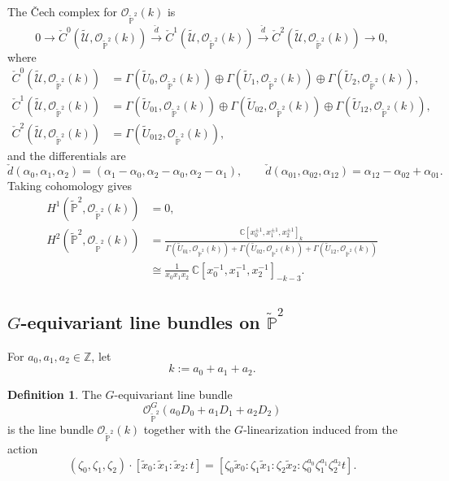 \documentclass[dvipsnames,11pt]{article}
\theoremstyle{definition}
\newtheorem{definition}[theorem]{Definition}
\newcommand{\cO}{\mathcal{O}}
\newcommand{\Z}{{\mathbb Z}}
\newcommand{\C}{{\mathbb C}}
\renewcommand{\P}{{\mathbb P}}
\begin{document}
\begin{appendices}
The \v Cech complex for \(\cO_{\widetilde{\P}^2}(k)\) is
\[
0
\to
\check C^0(\widetilde{\mathcal U},\cO_{\widetilde{\P}^2}(k))
\xrightarrow{\ \check d\ }
\check C^1(\widetilde{\mathcal U},\cO_{\widetilde{\P}^2}(k))
\xrightarrow{\ \check d\ }
\check C^2(\widetilde{\mathcal U},\cO_{\widetilde{\P}^2}(k))
\to 0,
\]
where
\begin{align*}
\check C^0(\widetilde{\mathcal U},\cO_{\widetilde{\P}^2}(k))
&=
\Gamma(\widetilde U_0,\cO_{\widetilde \P^2}(k))
\oplus
\Gamma(\widetilde U_1,\cO_{\widetilde \P^2}(k))
\oplus
\Gamma(\widetilde U_2,\cO_{\widetilde \P^2}(k)),\\
\check C^1(\widetilde{\mathcal U},\cO_{\widetilde{\P}^2}(k))
&=
\Gamma(\widetilde U_{01},\cO_{\widetilde \P^2}(k))
\oplus
\Gamma(\widetilde U_{02},\cO_{\widetilde \P^2}(k))
\oplus
\Gamma(\widetilde U_{12},\cO_{\widetilde \P^2}(k)),\\
\check C^2(\widetilde{\mathcal U},\cO_{\widetilde{\P}^2}(k))
&=
\Gamma(\widetilde U_{012},\cO_{\widetilde \P^2}(k)),
\end{align*}
and the differentials are
\[
\check d(\alpha_0,\alpha_1,\alpha_2)
=
(\alpha_1-\alpha_0,\alpha_2-\alpha_0,\alpha_2-\alpha_1),
\qquad \check d(\alpha_{01},\alpha_{02},\alpha_{12})
=
\alpha_{12}-\alpha_{02}+\alpha_{01}.
\]
Taking cohomology gives
\begin{align}
H^1(\widetilde{\P}^2,\cO_{\widetilde{\P}^2}(k))
&=0,
\nonumber\\
H^2(\widetilde{\P}^2,\cO_{\widetilde{\P}^2}(k))
&=
\frac{\C[x_0^{\pm1},x_1^{\pm1},x_2^{\pm1}]_k}
{\Gamma(\widetilde U_{01},\cO_{\widetilde \P^2}(k))
+
\Gamma(\widetilde U_{02},\cO_{\widetilde \P^2}(k))
+
\Gamma(\widetilde U_{12},\cO_{\widetilde \P^2}(k))}
\nonumber\\
&\cong
\frac{1}{x_0x_1x_2}\,
\C[x_0^{-1},x_1^{-1},x_2^{-1}]_{-k-3}.
\label{eq:h2}
\end{align}

\subsection{\texorpdfstring{$G$}{G}-equivariant line bundles on \texorpdfstring{$\widetilde{\P}^2$}{P2-tilde}}

For \(a_0,a_1,a_2 \in \Z\), let
\[
k:=a_0+a_1+a_2.
\]
\begin{definition}
    
The \(G\)-equivariant line bundle
\[
\cO^G_{\widetilde{\P}^2}(a_0D_0+a_1D_1+a_2D_2)
\]
is the line bundle \(\cO_{\widetilde{\P}^2}(k)\) together with the \(G\)-linearization induced from the action
\[
(\zeta_0,\zeta_1,\zeta_2)\cdot [\widetilde x_0:\widetilde x_1:\widetilde x_2:t]
=
[\zeta_0\widetilde x_0:\zeta_1\widetilde x_1:\zeta_2\widetilde x_2:\zeta_0^{a_0}\zeta_1^{a_1}\zeta_2^{a_2}t].
\]
\end{definition}


\end{appendices}
\end{document}
